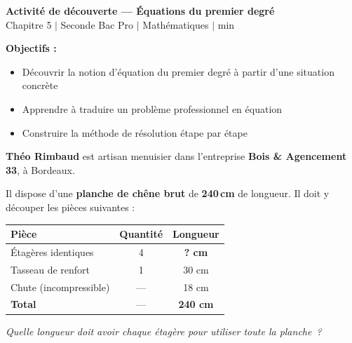 \documentclass[a4paper,11pt]{article}
\begin{document}
{\centering
  {\LARGE\bfseries\color{prim} Activité de découverte — Équations du premier degré}\\[6pt]
  {\normalsize Chapitre 5 \;$\vert$\; Seconde Bac Pro \;$\vert$\; Mathématiques \;$\vert$\; \raisebox{-0.5pt}{\large$\circlearrowleft$} min}\\[10pt]
}

\begin{objectifs}
\textbf{Objectifs :}
\begin{itemize}[leftmargin=14pt]
  \item Découvrir la notion d'équation du premier degré à partir d'une situation concrète
  \item Apprendre à traduire un problème professionnel en équation
  \item Construire la méthode de résolution étape par étape
\end{itemize}
\end{objectifs}

\vspace{6pt}

\begin{situation}
\textbf{Théo Rimbaud} est artisan menuisier dans l'entreprise \textbf{Bois \& Agencement\,33}, à Bordeaux.

\medskip
Il dispose d'une \textbf{planche de chêne brut} de \textbf{240\,cm} de longueur.
Il doit y découper les pièces suivantes :

\medskip
\begin{center}
\renewcommand{\arraystretch}{1.3}
\begin{tabular}{|l|c|c|}
\hline
\textbf{Pièce} & \textbf{Quantité} & \textbf{Longueur}\\
\hline
Étagères identiques & 4 & \textbf{? cm}\\
\hline
Tasseau de renfort & 1 & 30 cm\\
\hline
Chute (incompressible) & — & 18 cm\\
\hline
\textbf{Total} & — & \textbf{240 cm}\\
\hline
\end{tabular}
\end{center}
\end{situation}

\vspace{4pt}

\begin{problematique}
\textit{Quelle longueur doit avoir chaque étagère pour utiliser toute la planche~?}
\end{problematique}
\end{document}
